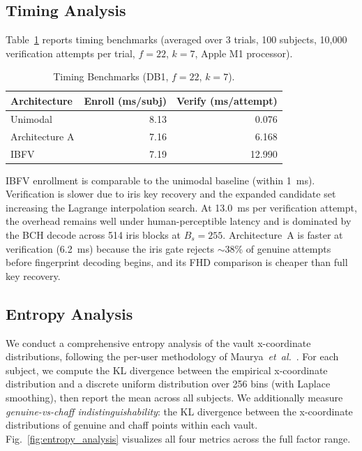 \documentclass[3p,twocolumn]{elsarticle}
\newcommand{\IBFV}{\textsf{IBFV}}
\begin{document}
\subsection{Timing Analysis}
\label{sec:timing_results}

Table~\ref{tab:timing} reports timing benchmarks (averaged over 3 trials, 100 subjects, 10{,}000 verification attempts per trial, $f = 22$, $k = 7$, Apple M1 processor).

\begin{table}[t]
\centering
\caption{Timing Benchmarks (DB1, $f = 22$, $k = 7$).}
\label{tab:timing}
\begin{tabular}{@{}l r r@{}}
\toprule
\textbf{Architecture} & \textbf{Enroll (ms/subj)} & \textbf{Verify (ms/attempt)} \\
\midrule
Unimodal & 8.13 & 0.076 \\
Architecture A & 7.16 & 6.168 \\
\IBFV{} & 7.19 & 12.990 \\
\bottomrule
\end{tabular}
\end{table}

\IBFV{} enrollment is comparable to the unimodal baseline (within 1~ms). Verification is slower due to iris key recovery and the expanded candidate set increasing the Lagrange interpolation search. At 13.0~ms per verification attempt, the overhead remains well under human-perceptible latency and is dominated by the BCH decode across 514 iris blocks at $B_s = 255$. Architecture~A is faster at verification (6.2~ms) because the iris gate rejects $\sim$38\% of genuine attempts before fingerprint decoding begins, and its FHD comparison is cheaper than full key recovery.

\subsection{Entropy Analysis}
\label{sec:entropy_results}

We conduct a comprehensive entropy analysis of the vault x-coordinate distributions, following the per-user methodology of Maurya~\textit{et~al.}~\cite{maurya2025enhancing}. For each subject, we compute the KL divergence between the empirical x-coordinate distribution and a discrete uniform distribution over 256 bins (with Laplace smoothing), then report the mean across all subjects. We additionally measure \emph{genuine-vs-chaff indistinguishability}: the KL divergence between the x-coordinate distributions of genuine and chaff points within each vault. Fig.~\ref{fig:entropy_analysis} visualizes all four metrics across the full factor range.
\end{document}
